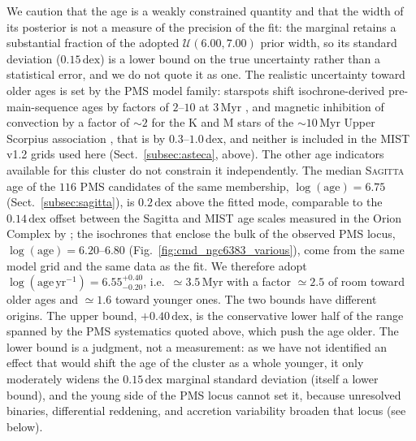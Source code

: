 \documentclass{aa}
\begin{document}
We caution that the age is a weakly constrained quantity and that the width of its posterior is not a measure of the precision of the fit: the marginal retains a substantial fraction of the adopted $\mathcal{U}(6.00,7.00)$ prior width, so its standard deviation ($0.15\,\mathrm{dex}$) is a lower bound on the true uncertainty rather than a statistical error, and we do not quote it as one. The realistic uncertainty toward older ages is set by the PMS model family: starspots shift isochrone-derived pre-main-sequence ages by factors of $2$--$10$ at $3\,\mathrm{Myr}$ \citep{2015ApJ...807..174S}, and magnetic inhibition of convection by a factor of $\sim2$ for the K and M stars of the $\sim10\,\mathrm{Myr}$ Upper Scorpius association \citep{2016A&A...593A..99F}, that is by $0.3$--$1.0\,\mathrm{dex}$, and neither is included in the \textsc{MIST} v1.2 grids used here (Sect.~\ref{subsec:asteca}, above). The other age indicators available for this cluster do not constrain it independently. The median \textsc{Sagitta} age of the $116$ PMS candidates of the same membership, $\log(\mathrm{age})=6.75$ (Sect.~\ref{subsec:sagitta}), is $0.2\,\mathrm{dex}$ above the fitted mode, comparable to the $0.14\,\mathrm{dex}$ offset between the Sagitta and \textsc{MIST} age scales measured in the Orion Complex by \citet{2023AJ....165..182K}; the isochrones that enclose the bulk of the observed PMS locus, $\log(\mathrm{age})=6.20$--$6.80$ (Fig.~\ref{fig:cmd_ngc6383_various}), come from the same model grid and the same data as the fit. We therefore adopt $\log(\mathrm{age}\,\mathrm{yr^{-1}}) = 6.55^{+0.40}_{-0.20}$, i.e.\ $\simeq3.5\,\mathrm{Myr}$ with a factor $\simeq2.5$ of room toward older ages and $\simeq1.6$ toward younger ones. The two bounds have different origins. The upper bound, $+0.40\,\mathrm{dex}$, is the conservative lower half of the range spanned by the PMS systematics quoted above, which push the age older. The lower bound is a judgment, not a measurement: as we have not identified an effect that would shift the age of the cluster as a whole younger, it only moderately widens the $0.15\,\mathrm{dex}$ marginal standard deviation (itself a lower bound), and the young side of the PMS locus cannot set it, because unresolved binaries, differential reddening, and accretion variability broaden that locus (see below).
\end{document}
